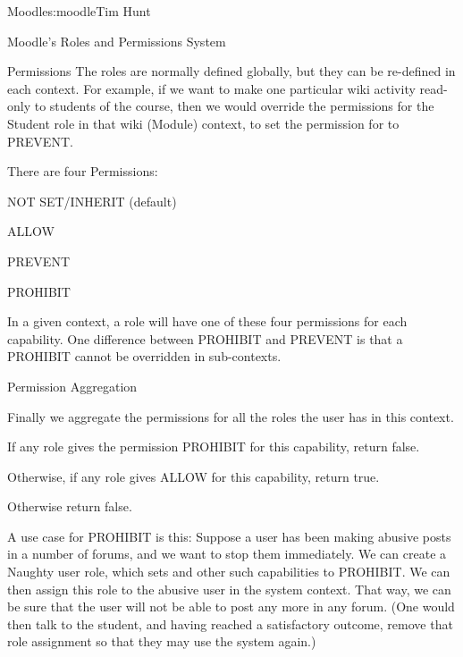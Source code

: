 \begin{aosachapter}{Moodle}{s:moodle}{Tim Hunt}
\begin{aosasect1}{Moodle's Roles and Permissions System}
\begin{aosasect2}{Permissions}
The roles are normally defined globally, but they can be re-defined in
each context. For example, if we want to make one particular wiki
activity read-only to students of the course, then we would override
the permissions for the Student role in that wiki (Module) context, to
set the permission for  to PREVENT.

There are four Permissions:

\begin{aosaitemize}

\item NOT SET/INHERIT (default)

\item ALLOW

\item PREVENT

\item PROHIBIT 

\end{aosaitemize}

In a given context, a role will have one of these four permissions for
each capability. One difference between PROHIBIT and PREVENT is that a
PROHIBIT cannot be overridden in sub-contexts.

\end{aosasect2}

\begin{aosasect2}{Permission Aggregation}

Finally we aggregate the permissions for all the roles the user has in
this context.

\begin{aosaitemize}

\item If any role gives the permission PROHIBIT for this capability,
  return false.

\item Otherwise, if any role gives ALLOW for this capability, return
  true.

\item Otherwise return false.

\end{aosaitemize}

A use case for PROHIBIT is this: Suppose a user has been making
abusive posts in a number of forums, and we want to stop them
immediately. We can create a Naughty user role, which sets
 and other such capabilities to PROHIBIT. We can
then assign this role to the abusive user in the system context. That
way, we can be sure that the user will not be able to post any more in
any forum. (One would then talk to the student, and having reached a
satisfactory outcome, remove that role assignment so that they may
use the system again.)


\end{aosasect2}
\end{aosasect1}
\end{aosachapter}
